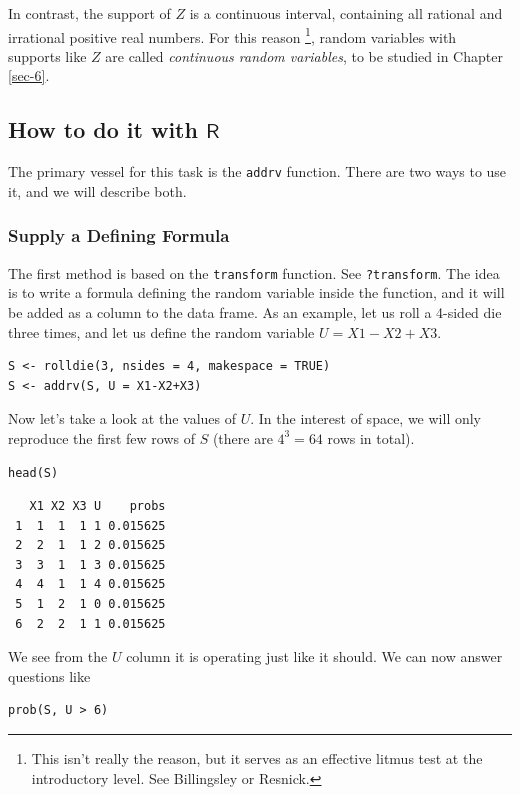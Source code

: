 \documentclass[captions=tableheading]{scrbook}
\begin{document}
In contrast, the support of \(Z\) is a continuous interval, containing all rational and irrational positive real numbers. For this reason
\footnote{This isn't really the reason, but it serves as an effective litmus test at the introductory level. See Billingsley or Resnick.},
random variables with supports like \(Z\) are called \emph{continuous random variables}, to be studied in Chapter \ref{sec-6}.
\subsection{How to do it with \(\mathsf{R}\)}
\label{sec-4-9-1}


The primary vessel for this task is the \texttt{addrv} function. There are two ways to use it, and we will describe both.
\subsubsection{Supply a Defining Formula}
\label{sec-4-9-1-1}


The first method is based on the \texttt{transform} function. See \texttt{?transform}. The idea is to write a formula defining the random variable inside the function, and it will be added as a column to the data frame. As an example, let us roll a 4-sided die three times, and let us define the random variable \(U=X1-X2+X3\). 


\begin{verbatim}
S <- rolldie(3, nsides = 4, makespace = TRUE) 
S <- addrv(S, U = X1-X2+X3)
\end{verbatim}

Now let's take a look at the values of \(U\). In the interest of space, we will only reproduce the first few rows of \(S\) (there are \(4^{3}=64\) rows in total). 


\begin{verbatim}
head(S)
\end{verbatim}

\begin{verbatim}
   X1 X2 X3 U    probs
 1  1  1  1 1 0.015625
 2  2  1  1 2 0.015625
 3  3  1  1 3 0.015625
 4  4  1  1 4 0.015625
 5  1  2  1 0 0.015625
 6  2  2  1 1 0.015625
\end{verbatim}

We see from the \(U\) column it is operating just like it should. We can now answer questions like


\begin{verbatim}
prob(S, U > 6)
\end{verbatim}
\end{document}
